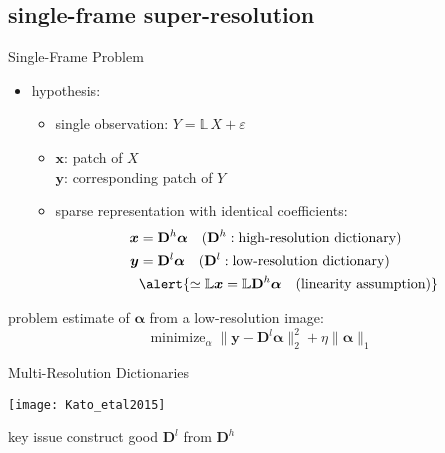 \documentclass[fleqn,aspectratio=1610]{beamer}
\begin{document}
\subsection{single-frame super-resolution}
\label{sec:org99c8c99}
\begin{frame}[label={sec:org668e201}]{Single-Frame Problem}
\begin{itemize}
\item hypothesis:
\begin{itemize}
\item single observation:
\(Y= \mathbb{L}\,X+\varepsilon\)
\item \(\boldsymbol{x}\): patch of \(X\)\\[0pt]
\(\boldsymbol{y}\): corresponding patch of \(Y\)
\item sparse representation with identical coefficients:
\begin{align}
  \boldsymbol{x}&=\mathbf{D}^{h}\boldsymbol{\alpha}
                  \quad (\mathbf{D}^{h}:\text{high-resolution dictionary})\\
  \boldsymbol{y}&=\mathbf{D}^{l}\boldsymbol{\alpha}
                  \quad (\mathbf{D}^{l}:\text{low-resolution dictionary})\\
                &\alert{%
                  \simeq \mathbb{L}\boldsymbol{x} = \mathbb{L}\mathbf{D}^{h}\boldsymbol{\alpha}
                  \quad\text{(linearity assumption)}}
\end{align}
\end{itemize}
\end{itemize}
\begin{alertblock}{problem}
estimate of \(\boldsymbol{\alpha}\) from a low-resolution image:
\begin{equation}
  \mathop{\text{minimize}}_{\alpha}
  \|\boldsymbol{y}-\mathbf{D}^{l}\boldsymbol{\alpha}\|_2^2+\eta\|\boldsymbol{\alpha}\|_1
\end{equation}
\end{alertblock}
\end{frame}

\begin{frame}[label={sec:orgeb15292}]{Multi-Resolution Dictionaries}
\begin{center}
\texttt{[image: Kato\_etal2015]}
\end{center}
\begin{alertblock}{key issue}
construct good \(\mathbf{D}^{l}\) from \(\mathbf{D}^{h}\)
\end{alertblock}
\end{frame}
\end{document}
